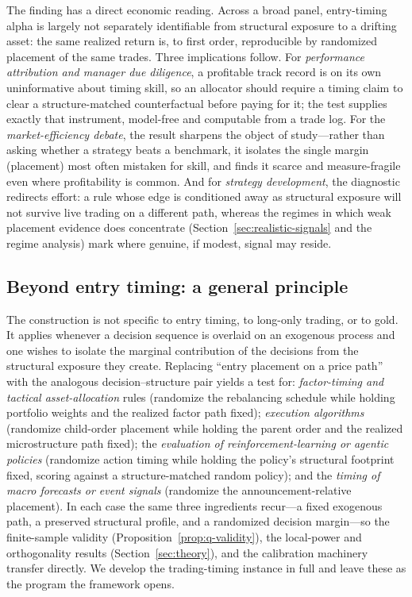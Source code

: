 \documentclass[preprint,12pt]{elsarticle}
\theoremstyle{definition}
\begin{document}
The finding has a direct economic reading. Across a broad panel, entry-timing alpha is largely not separately identifiable from structural exposure to a drifting asset: the same realized return is, to first order, reproducible by randomized placement of the same trades. Three implications follow. For \emph{performance attribution and manager due diligence}, a profitable track record is on its own uninformative about timing skill, so an allocator should require a timing claim to clear a structure-matched counterfactual before paying for it; the test supplies exactly that instrument, model-free and computable from a trade log. For the \emph{market-efficiency debate}, the result sharpens the object of study---rather than asking whether a strategy beats a benchmark, it isolates the single margin (placement) most often mistaken for skill, and finds it scarce and measure-fragile even where profitability is common. And for \emph{strategy development}, the diagnostic redirects effort: a rule whose edge is conditioned away as structural exposure will not survive live trading on a different path, whereas the regimes in which weak placement evidence does concentrate (Section~\ref{sec:realistic-signals} and the regime analysis) mark where genuine, if modest, signal may reside.

\subsection{Beyond entry timing: a general principle}

The construction is not specific to entry timing, to long-only trading, or to gold. It applies whenever a decision sequence is overlaid on an exogenous process and one wishes to isolate the marginal contribution of the decisions from the structural exposure they create. Replacing ``entry placement on a price path'' with the analogous decision--structure pair yields a test for: \emph{factor-timing and tactical asset-allocation} rules (randomize the rebalancing schedule while holding portfolio weights and the realized factor path fixed); \emph{execution algorithms} (randomize child-order placement while holding the parent order and the realized microstructure path fixed); the \emph{evaluation of reinforcement-learning or agentic policies} (randomize action timing while holding the policy's structural footprint fixed, scoring against a structure-matched random policy); and the \emph{timing of macro forecasts or event signals} (randomize the announcement-relative placement). In each case the same three ingredients recur---a fixed exogenous path, a preserved structural profile, and a randomized decision margin---so the finite-sample validity (Proposition~\ref{prop:q-validity}), the local-power and orthogonality results (Section~\ref{sec:theory}), and the calibration machinery transfer directly. We develop the trading-timing instance in full and leave these as the program the framework opens.
\end{document}
